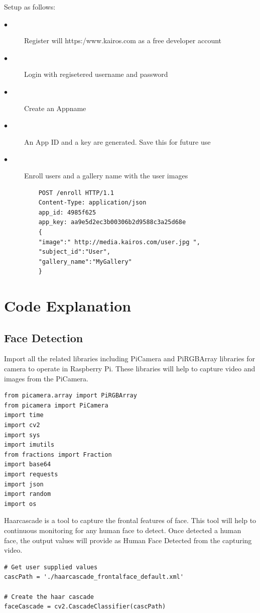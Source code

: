 \documentclass[sigconf]{acmart}
\begin{document}
Setup as follows:

\begin{description}
    \item[$\bullet$] Register will https:/www.kairos.com as a free developer account
    \item[$\bullet$] Login with regisetered username and password
    \item[$\bullet$] Create an Appname
    \item[$\bullet$] An App ID and a key are generated. Save this for future use
    \item[$\bullet$] Enroll users and a gallery name with the user images
    \begin{lstlisting}
    POST /enroll HTTP/1.1
    Content-Type: application/json
    app_id: 4985f625
    app_key: aa9e5d2ec3b00306b2d9588c3a25d68e
    {
    "image":" http://media.kairos.com/user.jpg ",
    "subject_id":"User",
    "gallery_name":"MyGallery"
    }
    \end{lstlisting}
\end{description}

\section{Code Explanation}
\subsection{Face Detection}
Import all the related libraries including PiCamera and PiRGBArray libraries for camera to operate in Raspberry Pi. These libraries will help to capture video and images from the PiCamera.

\begin{lstlisting}
from picamera.array import PiRGBArray
from picamera import PiCamera
import time
import cv2
import sys
import imutils
from fractions import Fraction
import base64
import requests
import json
import random
import os
\end{lstlisting}

Haarcascade is a tool to capture the frontal features of face. This tool will help to continuous monitoring for any human face to detect. Once detected a human face, the output values will provide as Human Face Detected from the capturing video.

\begin{lstlisting}
# Get user supplied values
cascPath = './haarcascade_frontalface_default.xml'

# Create the haar cascade
faceCascade = cv2.CascadeClassifier(cascPath)
\end{lstlisting}
\end{document}
